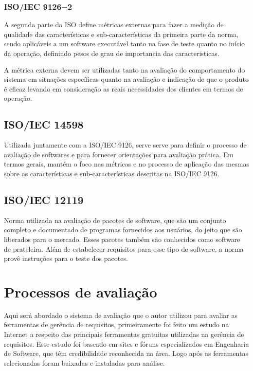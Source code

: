 \subsubsection{ISO/IEC 9126$-$2}

  A segunda parte da ISO define métricas externas para fazer a medição de qualidade das características e sub-características da
  primeira parte da norma, sendo aplicáveis a um software executável tanto na fase de teste quanto no início da operação, definindo
  pesos de grau de importancia das caracteristicas.

  A métrica externa devem ser utilizadas tanto na avaliação do comportamento do sistema em situações específicas quanto na avaliação
  e indicação de que o produto é eficaz levando em consideração as reais necessidades dos clientes em termos de operação.

\subsection{ISO/IEC 14598}

  Utilizada juntamente com a ISO/IEC 9126, serve serve para definir o processo de avaliação de softwares e para fornecer orientações
  para avaliação prática. Em termos gerais, mantém o foco nas métricas e no processo de aplicação das mesmas sobre as características
  e sub-características descritas na ISO/IEC 9126.

\subsection{ISO/IEC 12119}

  Norma utilizada na avaliação de pacotes de software, que são um conjunto completo e documentado de programas fornecidos aos usuários,
  do jeito que são liberados para o mercado. Esses pacotes também são conhecidos como software de prateleira. Além de estabelecer
  requisitos para esse tipo de software, a norma provê instruções para o teste dos pacotes.

\section{Processos de avaliação}

  Aqui será abordado o sistema de avaliação que o autor utilizou para avaliar as ferramentas de gerência de requisitos, primeiramente
  foi feito um estudo na Internet a respeito das principais ferramentas gratuitas utilizadas na gerência de requisitos. Esse estudo foi
  baseado em sites e fóruns especializados em Engenharia de Software, que têm credibilidade reconhecida na área. Logo após as
  ferramentas selecionadas foram baixadas e instaladas para análise.


